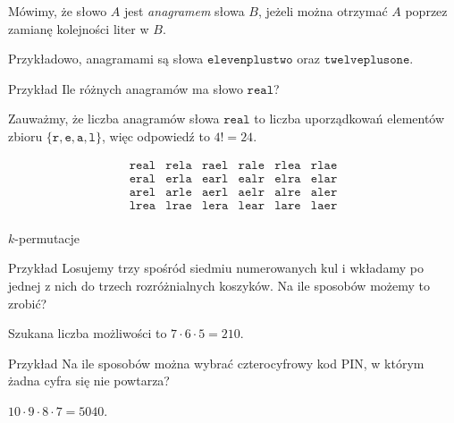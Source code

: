 \documentclass[a4paper,10pt]{beamer}
\begin{document}
\begin{frame}

\begin{block}{}
Mówimy, że słowo $A$ jest {\it anagramem} słowa $B$, jeżeli można otrzymać $A$ poprzez zamianę kolejności liter w $B$.
\end{block}

\medskip

Przykładowo, anagramami są słowa $\mathtt{elevenplustwo}$ oraz $\mathtt{twelveplusone}.$

\medskip

\begin{exampleblock}{Przykład}\label{ex2}
Ile różnych anagramów ma słowo $\mathtt{real}$?

\medskip

Zauważmy, że liczba anagramów słowa $\mathtt{real}$ to liczba uporządkowań elementów zbioru $\{\mathtt{r},\mathtt{e},\mathtt{a},\mathtt{l}\}$, więc odpowiedź to $4!=24$.

$$\begin{array}{cccccc}
\mathtt{real}&\mathtt{rela}&\mathtt{rael}&\mathtt{rale}&\mathtt{rlea}&\mathtt{rlae}\\
\mathtt{eral}&\mathtt{erla}&\mathtt{earl}&\mathtt{ealr}&\mathtt{elra}&\mathtt{elar}\\
\mathtt{arel}&\mathtt{arle}&\mathtt{aerl}&\mathtt{aelr}&\mathtt{alre}&\mathtt{aler}\\
\mathtt{lrea}&\mathtt{lrae}&\mathtt{lera}&\mathtt{lear}&\mathtt{lare}&\mathtt{laer}\\
\end{array}$$
\end{exampleblock}
\end{frame}
	








\begin{frame}{$k$-permutacje}
	
	\begin{exampleblock}{Przykład}
		Losujemy trzy spośród siedmiu numerowanych kul i wkładamy po jednej z nich do trzech rozróżnialnych koszyków. Na ile sposobów możemy to zrobić?
		
		\vspace{0.3cm}
		Szukana liczba możliwości to $7\cdot6\cdot5=210$.
	\end{exampleblock}


	\begin{exampleblock}{Przykład}
	Na ile sposobów można wybrać czterocyfrowy kod PIN, w którym żadna cyfra się nie powtarza?
	
	\vspace{0.3cm}
	$10\cdot9\cdot8\cdot7=5040$.
	\end{exampleblock}


\end{frame}
\end{document}
